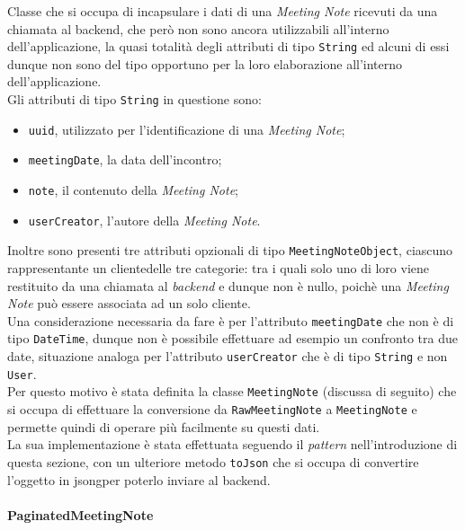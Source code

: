 \noindent Classe che si occupa di incapsulare i dati di una \emph{Meeting Note} ricevuti da una chiamata al \gls{backend}\glsoccur, che però non sono ancora utilizzabili all'interno dell'applicazione, la quasi totalità degli attributi di tipo \lstinline{String} ed alcuni di essi dunque non sono del tipo opportuno per la loro elaborazione all'interno dell'applicazione.\\
Gli attributi di tipo \lstinline{String} in questione sono:
\begin{itemize}
    \item \lstinline{uuid}, utilizzato per l'identificazione di una \emph{Meeting Note};
    \item \lstinline{meetingDate}, la data dell'incontro;
    \item \lstinline{note}, il contenuto della \emph{Meeting Note};
    \item \lstinline{userCreator}, l'autore della \emph{Meeting Note}.
\end{itemize}
Inoltre sono presenti tre attributi opzionali di tipo \lstinline{MeetingNoteObject}, ciascuno rappresentante un \gls{cliente}\glsoccur delle tre categorie: tra i quali solo uno di loro viene restituito da una chiamata al \emph{backend} e dunque non è nullo, poichè una \emph{Meeting Note} può essere associata ad un solo \gls{cliente}\glsoccur.\\
Una considerazione necessaria da fare è per l'attributo \lstinline{meetingDate} che non è di tipo \lstinline{DateTime}\cite{site:date-time}, dunque non è possibile effettuare ad esempio un confronto tra due date, situazione analoga per l'attributo \lstinline{userCreator} che è di tipo \lstinline{String} e non \lstinline{User}.\\
Per questo motivo è stata definita la classe \lstinline{MeetingNote} (discussa di seguito) che si occupa di effettuare la conversione da \lstinline{RawMeetingNote} a \lstinline{MeetingNote} e permette quindi di operare più facilmente su questi dati. \\
La sua implementazione è stata effettuata seguendo il \emph{pattern} nell'introduzione di questa sezione, con un ulteriore metodo \lstinline{toJson} che si occupa di convertire l'oggetto in \gls{jsong}\glsoccur per poterlo inviare al \gls{backend}\glsoccur.

\paragraph*{PaginatedMeetingNote} ~ \\
\label{par:paginated-meeting-note}

